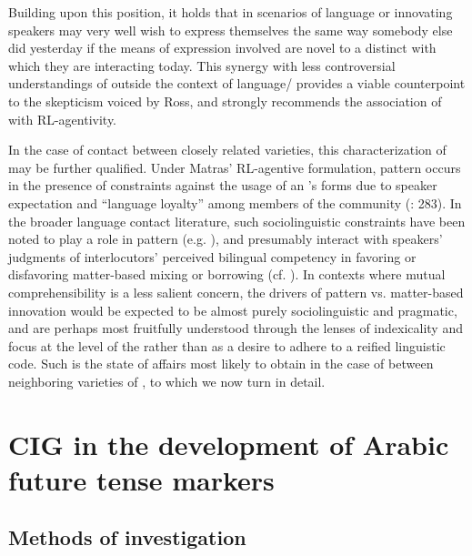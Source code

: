 \documentclass[output=paper]{langsci/langscibook}
\begin{document}
Building upon this position, it holds that in scenarios of language or  innovating speakers may very well wish to express themselves the same way somebody else did yesterday if the means of expression involved are novel to a distinct  with which they are interacting today. This synergy with less controversial understandings of  outside the context of language/ provides a viable counterpoint to the skepticism voiced by Ross, and strongly recommends the association of  with RL-agentivity.

In the case of contact between closely related varieties, this characterization of  may be further qualified. Under Matras’ RL-agentive formulation, pattern  occurs in the presence of constraints against the usage of an ’s forms due to speaker expectation and “language loyalty” among members of the  community (\citeyear{Matras2011gram}: 283).  In the broader language contact literature, such sociolinguistic constraints have been noted to play a role in pattern  (e.g. \citealt{Epps2005}), and presumably interact with speakers’ judgments of interlocutors’ perceived bilingual competency in favoring or disfavoring matter-based mixing or borrowing (cf. \citealt{Grosjean2001}). In contexts where mutual comprehensibility is a less salient concern, the drivers of pattern vs. matter-based innovation would be expected to be almost purely sociolinguistic and pragmatic, and are perhaps most fruitfully understood through the lenses of indexicality \citep{Silverstein2003} and focus at the level of the  \citep{LePageTabouret-Keller1985} rather than as a desire to adhere to a reified linguistic code. Such is the state of affairs most likely to obtain in the case of  between neighboring varieties of , to which we now turn in detail.

\section{CIG in the development of Arabic future tense markers}

\subsection{Methods of investigation}
\end{document}
